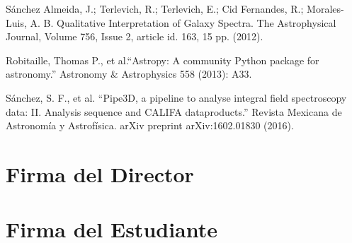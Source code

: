 \documentclass[12pt]{article}
\begin{document}
\begin{thebibliography}{10}
 S\'anchez Almeida, J.; Terlevich, R.; Terlevich, E.;
  Cid Fernandes, R.; Morales-Luis, A. B. Qualitative Interpretation of
  Galaxy Spectra. The Astrophysical Journal, Volume 756, Issue 2,
  article id. 163, 15 pp. (2012).



 Robitaille, Thomas P., et al.``Astropy: A community Python
 package for astronomy.'' Astronomy \& Astrophysics 558 (2013): A33.


 S\'anchez, S. F., et al. ``Pipe3D, a pipeline to analyse integral
 field spectroscopy data: II. Analysis sequence and CALIFA dataproducts.'' Revista Mexicana de Astronom\'ia y Astrof\'isica.
 arXiv preprint arXiv:1602.01830 (2016).

\end{thebibliography}

\section*{Firma del Director}
\vspace{1.5cm}

\section*{Firma del Estudiante	}
\end{document}
